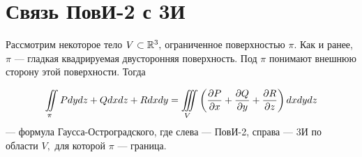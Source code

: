 \documentclass[../../main.tex]{subfiles}
\begin{document}
\section{Связь ПовИ-2 с 3И}

Рассмотрим некоторое тело $V\subset \mathbb{R}^3,$ ограниченное поверхностью $\pi.$ 
Как и ранее, $\pi$ --- гладкая квадрируемая двусторонняя поверхность. 
Под $\pi$ понимают внешнюю сторону этой поверхности. Тогда 

\begin{equation}\label{lec24, num_3}
\iint\limits_\pi Pdydz +  Qdxdz + Rdxdy = \iiint\limits_V \left(\frac{\partial P}{\partial x}
  + \frac{\partial Q}{\partial y} + \frac{\partial R}{\partial z}\right) dxdydz\end{equation} --- формула
   Гаусса-Остроградского, где слева --- ПовИ-2, справа --- 3И по области $V,$
    для которой $\pi$ --- граница.
\end{document}
